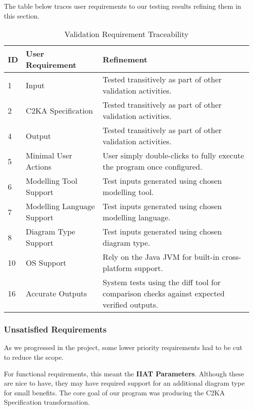 The table below traces user requirements to our testing results refining them in this section.
\begin{table}[htbp]
    \centering
    \caption{Validation Requirement Traceability}\label{tab:test-res-table}
    \begin{tabularx}{\textwidth}{| l | l | X |}
        \hline
        \textbf{ID} & \textbf{User Requirement} & \textbf{Refinement} \\
        \hline
        1 & Input & Tested transitively as part of other validation activities. \\ \hline
        2 & C2KA Specification & Tested transitively as part of other validation activities.\\ \hline
        4 & Output & Tested transitively as part of other validation activities.\\ \hline
        5 & Minimal User Actions & User simply double-clicks to fully execute the program once configured.\\ \hline
        6 & Modelling Tool Support & Test inputs generated using chosen modelling tool.\\ \hline
        7 & Modelling Language Support  & Test inputs generated using chosen modelling language.\\ \hline
        8 & Diagram Type Support  & Test inputs generated using chosen diagram type.\\ \hline
        10 & OS Support & Rely on the Java JVM for built-in cross-platform support.\\ \hline
        16 & Accurate Outputs & System tests using the diff tool for comparison checks against expected verified outputs. \\ \hline
    \end{tabularx}
\end{table}

\newpage
\subsubsection{Unsatisfied Requirements} \label{subsubsec:unsat-reqs}
As we progressed in the project, some lower priority requirements had to be cut to reduce the scope.

For functional requirements, this meant the \textbf{IIAT Parameters}.
Although these are nice to have, they may have required support for an additional diagram type for small benefits.
The core goal of our program was producing the C2KA Specification transformation.

